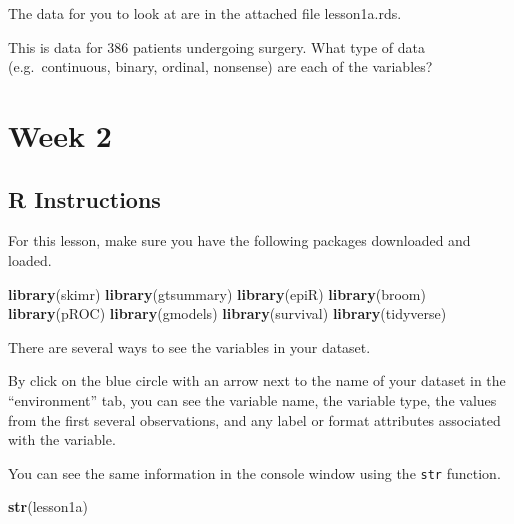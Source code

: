 \documentclass[]{book}
\newenvironment{Shaded}{\begin{snugshade}}{\end{snugshade}}
\newcommand{\KeywordTok}[1]{\textcolor[rgb]{0.13,0.29,0.53}{\textbf{#1}}}
\newcommand{\NormalTok}[1]{#1}
\begin{document}
The data for you to look at are in the attached file lesson1a.rds.

This is data for 386 patients undergoing surgery. What type of data (e.g.~continuous, binary, ordinal, nonsense) are each of the variables?

\hypertarget{week-2}{%
\chapter{Week 2}\label{week-2}}

\hypertarget{r-instructions-1}{%
\section{R Instructions}\label{r-instructions-1}}

For this lesson, make sure you have the following packages downloaded and loaded.

\begin{Shaded}
\begin{Highlighting}[]
\KeywordTok{library}\NormalTok{(skimr)}
\KeywordTok{library}\NormalTok{(gtsummary)}
\KeywordTok{library}\NormalTok{(epiR)}
\KeywordTok{library}\NormalTok{(broom)}
\KeywordTok{library}\NormalTok{(pROC)}
\KeywordTok{library}\NormalTok{(gmodels)}
\KeywordTok{library}\NormalTok{(survival)}
\KeywordTok{library}\NormalTok{(tidyverse)}
\end{Highlighting}
\end{Shaded}

There are several ways to see the variables in your dataset.

By click on the blue circle with an arrow next to the name of your dataset in the ``environment'' tab, you can see the variable name, the variable type, the values from the first several observations, and any label or format attributes associated with the variable.

You can see the same information in the console window using the \texttt{str} function.

\begin{Shaded}
\begin{Highlighting}[]
\KeywordTok{str}\NormalTok{(lesson1a)}
\end{Highlighting}
\end{Shaded}
\end{document}
